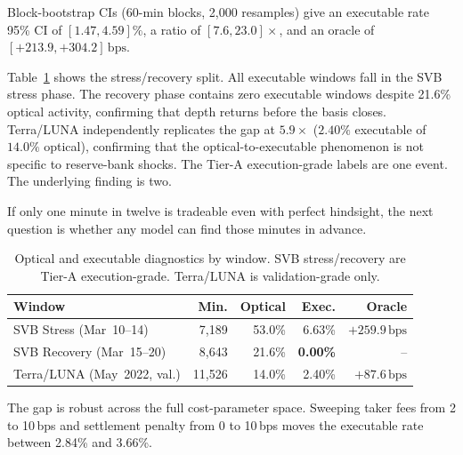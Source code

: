 \documentclass[sigconf,anonymous,natbib=false]{acmart}
\newcommand{\bps}{\,\text{bps}}
\begin{document}
Block-bootstrap CIs (60-min blocks, 2,000 resamples) give an executable
rate 95\% CI of $[1.47, 4.59]\%$, a ratio of $[7.6, 23.0]\times$, and an
oracle of $[+213.9, +304.2]\bps$.

Table~\ref{tab:tier_a_compare} shows the stress/recovery split.
All executable windows fall in the SVB stress phase. The recovery
phase contains zero executable windows despite 21.6\% optical
activity, confirming that depth returns before the basis closes.
Terra/LUNA independently replicates the gap at $5.9\times$ ($2.40\%$
executable of $14.0\%$ optical), confirming that the optical-to-executable
phenomenon is not specific to reserve-bank shocks. The Tier-A
execution-grade labels are one event. The underlying finding is two.

If only one minute in twelve is tradeable even with perfect hindsight,
the next question is whether any model can find those minutes in
advance.

\begin{table}[h]
\centering
\caption{Optical and executable diagnostics by window.
  SVB stress/recovery are Tier-A execution-grade.
  Terra/LUNA is validation-grade only.}
\label{tab:tier_a_compare}
\setlength{\tabcolsep}{3pt}
{\small
\begin{tabular}{lrrrr}
\toprule
\textbf{Window} & \textbf{Min.} & \textbf{Optical} & \textbf{Exec.} & \textbf{Oracle}\\
\midrule
SVB Stress  (Mar~10--14)    & 7,189  & 53.0\% & 6.63\%           & $+259.9\bps$\\
SVB Recovery (Mar~15--20)   & 8,643  & 21.6\% & \textbf{0.00\%}  & --\\
Terra/LUNA (May~2022, val.) & 11,526 & 14.0\% & 2.40\%           & $+87.6\bps$\\
\bottomrule
\end{tabular}
}
\end{table}

The gap is robust across the full cost-parameter space. Sweeping
taker fees from 2 to 10\,bps and settlement penalty from 0 to 10\,bps
moves the executable rate between 2.84\% and 3.66\%.
\end{document}
